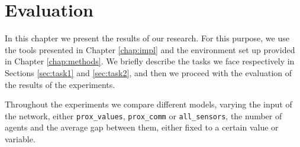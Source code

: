 \chapter{Evaluation}
\label{chap:experiments}

In this chapter we present the results of our research. 
For this purpose, we use the tools presented in Chapter \ref{chap:impl} and the 
environment set up provided in Chapter \ref{chap:methods}.
We briefly describe the tasks we face respectively in Sections \ref{sec:task1} and 
\ref{sec:task2}, and then we proceed with the evaluation of the results of the 
experiments.

Throughout the experiments we compare different models, varying the input of 
the network, either \texttt{prox\_values}, \texttt{prox\_comm} or 
\texttt{all\_sensors}, the number of agents and the average gap between them, 
either fixed to a certain value or variable.



